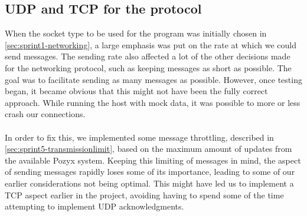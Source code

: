 \subsection{UDP and TCP for the protocol}
When the socket type to be used for the program was initially chosen in \autoref{sec:sprint1-networking}, a large emphasis was put on the rate at which we could send messages.
The sending rate also affected a lot of the other decisions made for the networking protocol, such as keeping messages as short as possible.
The goal was to facilitate sending as many messages as possible.
However, once testing began, it became obvious that this might not have been the fully correct approach.
While running the host with mock data, it was possible to more or less crash our connections.
\\\\
In order to fix this, we implemented some message throttling, described in \autoref{sec:sprint5-transmissionlimit}, based on the maximum amount of updates from the available Pozyx system.
Keeping this limiting of messages in mind, the aspect of sending messages rapidly loses some of its importance, leading to some of our earlier considerations not being optimal.
This might have led us to implement a TCP aspect earlier in the project, avoiding having to spend some of the time attempting to implement UDP acknowledgments. 

